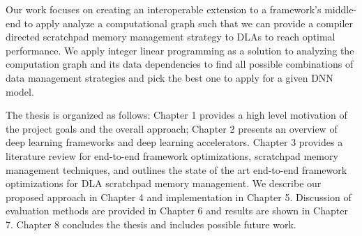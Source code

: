 Our work focuses on creating an interoperable extension to a framework's
middle-end to apply analyze a computational graph such that we can provide a
compiler directed scratchpad memory management strategy to DLAs to reach
optimal performance. We apply integer linear programming as a solution to analyzing
the computation graph and its data dependencies to find all possible combinations
of data management strategies and pick the best one to apply for a given DNN model.

The thesis is organized as follows: Chapter 1 provides a high level motivation
of the project goals and the overall approach; Chapter 2 presents an overview
of deep learning frameworks and deep learning accelerators. Chapter 3 provides
a literature review for end-to-end framework optimizations, scratchpad memory
management techniques, and outlines the state of the art end-to-end framework
optimizations for DLA scratchpad memory management. We describe our proposed
approach in Chapter 4 and implementation in Chapter 5. Discussion of evaluation
methods are provided in Chapter 6 and results are shown in Chapter 7. Chapter 8
concludes the thesis and includes possible future work.
